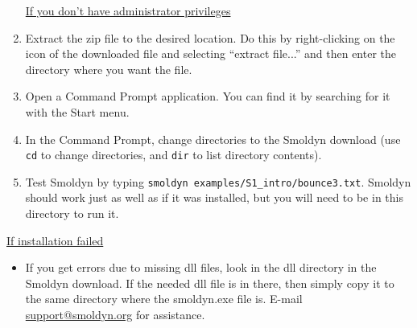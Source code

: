 \documentclass {scrbook}
\newcommand {\ttt} {\texttt}
\newcommand\setItemnumber[1]{\setcounter{enumi}{\numexpr#1-1\relax}}
\begin{document}
\begin{enumerate}
\underline{If you don't have administrator privileges}
\setItemnumber{2}
\item Extract the zip file to the desired location. Do this by right-clicking on the icon of the downloaded file and selecting ``extract file...'' and then enter the directory where you want the file.
\item Open a Command Prompt application. You can find it by searching for it with the Start menu.
\item In the Command Prompt, change directories to the Smoldyn download (use \ttt{cd} to change directories, and \ttt{dir} to list directory contents).
\item Test Smoldyn by typing \ttt{smoldyn examples/S1\_intro/bounce3.txt}. Smoldyn should work just as well as if it was installed, but you will need to be in this directory to run it.
\end{enumerate}

\underline{If installation failed}

\begin{itemize}

\item If you get errors due to missing dll files, look in the dll directory in the Smoldyn download. If the needed dll file is in there, then simply copy it to the same directory where the smoldyn.exe file is. E-mail \href{support@smoldyn.org}{support@smoldyn.org} for assistance.

\end{itemize}
\end{document}
